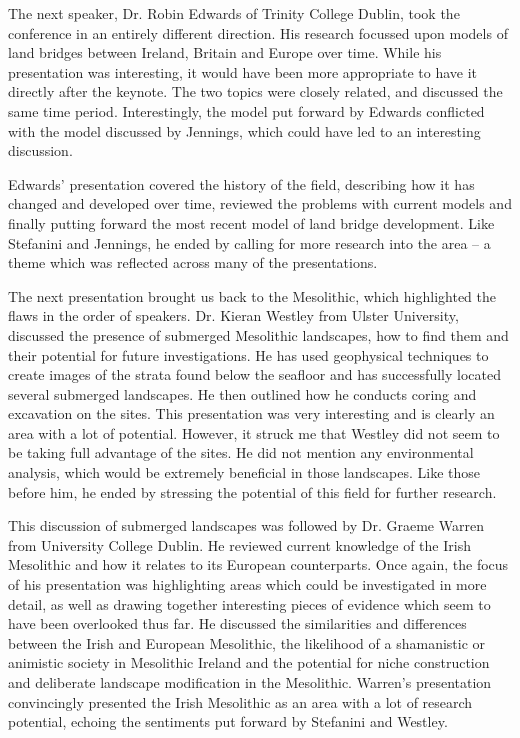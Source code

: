 The next speaker, Dr. Robin Edwards of Trinity College Dublin, took the conference in an entirely different direction. His research focussed upon models of land bridges between Ireland, Britain and Europe over time. While his presentation was interesting, it would have been more appropriate to have it directly after the keynote. The two topics were closely related, and discussed the same time period. Interestingly, the model put forward by Edwards conflicted with the model discussed by Jennings, which could have led to an interesting discussion. 

Edwards’ presentation covered the history of the field, describing how it has changed and developed over time, reviewed the problems with current models and finally putting forward the most recent model of land bridge development. Like Stefanini and Jennings, he ended by calling for more research into the area – a theme which was reflected across many of the presentations. 

The next presentation brought us back to the Mesolithic, which highlighted the flaws in the order of speakers. Dr. Kieran Westley from Ulster University, discussed the presence of submerged Mesolithic landscapes, how to find them and their potential for future investigations. He has used geophysical techniques to create images of the strata found below the seafloor and has successfully located several submerged landscapes. He then outlined how he conducts coring and excavation on the sites. This presentation was very interesting and is clearly an area with a lot of potential. However, it struck me that Westley did not seem to be taking full advantage of the sites. He did not mention any environmental analysis, which would be extremely beneficial in those landscapes. Like those before him, he ended by stressing the potential of this field for further research. 

This discussion of submerged landscapes was followed by Dr. Graeme Warren from University College Dublin. He reviewed current knowledge of the Irish Mesolithic and how it relates to its European counterparts. Once again, the focus of his presentation was highlighting areas which could be investigated in more detail, as well as drawing together interesting pieces of evidence which seem to have been overlooked thus far. He discussed the similarities and differences between the Irish and European Mesolithic, the likelihood of a shamanistic or animistic society in Mesolithic Ireland and the potential for niche construction and deliberate landscape modification in the Mesolithic. Warren’s presentation convincingly presented the Irish Mesolithic as an area with a lot of research potential, echoing the sentiments put forward by Stefanini and Westley.

